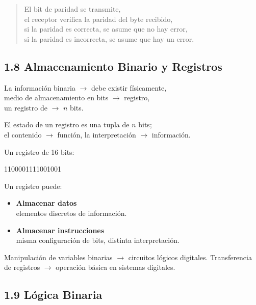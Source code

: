 \begin{verse} El bit de paridad se transmite, \\ el receptor verifica la
    paridad del byte recibido, \\ si la paridad es correcta, se asume que no hay
    error, \\ si la paridad es incorrecta, se asume que hay un error. \end{verse}

\subsection*{1.8 Almacenamiento Binario y Registros}

La informaci\'{o}n binaria $\rightarrow$ debe existir f\'{i}sicamente, \\ medio
de almacenamiento en bits $\rightarrow$ registro, \\ un registro de
$\rightarrow$ $n$ bits. \medbreak

El estado de un registro es una tupla de $n$ bits; \\ el contenido
$\rightarrow$ funci\'{o}n, la interpretaci\'{o}n $\rightarrow$ informaci\'{o}n.
\medbreak

Un registro de 16 bits: \begin{center} 1100001111001001 \end{center}

Un registro puede: \begin{itemize} \item \begin{center} \textbf{Almacenar
                  datos} \\ elementos discretos de informaci\'{o}n. \end{center} \item
          \begin{center} \textbf{Almacenar instrucciones} \\ misma configuraci\'{o}n de
              bits, distinta interpretaci\'{o}n. \end{center} \end{itemize} \medbreak

Manipulaci\'{o}n de variables binarias $\rightarrow$ circuitos l\'{o}gicos
digitales. \medbreak Transferencia de registros $\rightarrow$ operaci\'{o}n
b\'{a}sica en sistemas digitales. \medbreak

\subsection*{1.9 L\'{o}gica Binaria}

